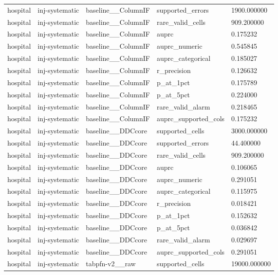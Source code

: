 \begin{tabular}{lllll}
hospital & inj-systematic & baseline\_\_ColumnIF & supported\_errors & 1900.000000 \\
hospital & inj-systematic & baseline\_\_ColumnIF & rare\_valid\_cells & 909.200000 \\
hospital & inj-systematic & baseline\_\_ColumnIF & auprc & 0.175232 \\
hospital & inj-systematic & baseline\_\_ColumnIF & auprc\_numeric & 0.545845 \\
hospital & inj-systematic & baseline\_\_ColumnIF & auprc\_categorical & 0.185027 \\
hospital & inj-systematic & baseline\_\_ColumnIF & r\_precision & 0.126632 \\
hospital & inj-systematic & baseline\_\_ColumnIF & p\_at\_1pct & 0.175789 \\
hospital & inj-systematic & baseline\_\_ColumnIF & p\_at\_5pct & 0.224000 \\
hospital & inj-systematic & baseline\_\_ColumnIF & rare\_valid\_alarm & 0.218465 \\
hospital & inj-systematic & baseline\_\_ColumnIF & auprc\_supported\_cols & 0.175232 \\
hospital & inj-systematic & baseline\_\_DDCcore & supported\_cells & 3000.000000 \\
hospital & inj-systematic & baseline\_\_DDCcore & supported\_errors & 44.400000 \\
hospital & inj-systematic & baseline\_\_DDCcore & rare\_valid\_cells & 909.200000 \\
hospital & inj-systematic & baseline\_\_DDCcore & auprc & 0.106065 \\
hospital & inj-systematic & baseline\_\_DDCcore & auprc\_numeric & 0.291051 \\
hospital & inj-systematic & baseline\_\_DDCcore & auprc\_categorical & 0.115975 \\
hospital & inj-systematic & baseline\_\_DDCcore & r\_precision & 0.018421 \\
hospital & inj-systematic & baseline\_\_DDCcore & p\_at\_1pct & 0.152632 \\
hospital & inj-systematic & baseline\_\_DDCcore & p\_at\_5pct & 0.036842 \\
hospital & inj-systematic & baseline\_\_DDCcore & rare\_valid\_alarm & 0.029697 \\
hospital & inj-systematic & baseline\_\_DDCcore & auprc\_supported\_cols & 0.291051 \\
hospital & inj-systematic & tabpfn-v2\_\_raw & supported\_cells & 19000.000000 \\

\end{tabular}
